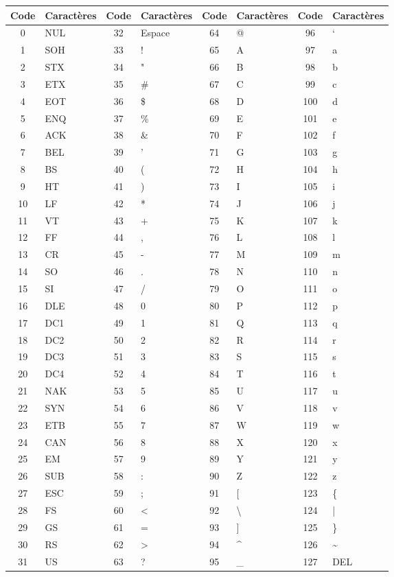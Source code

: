 \documentclass[12pt]{article}
\begin{document}
	\begin{tabular}{|c|l||c|l||c|l||c|l|}
		\hline
		Code & Caractères & Code & Caractères & Code & Caractères & Code & Caractères \\
		\hline
		0 & NUL & 32 & Espace & 64 & @ & 96 & ` \\
		1 & SOH & 33 & ! & 65 & A & 97 & a \\
		2 & STX & 34 & " & 66 & B & 98 & b \\
		3 & ETX & 35 & \# & 67 & C & 99 & c \\
		4 & EOT & 36 & \$ & 68 & D & 100 & d \\
		5 & ENQ & 37 & \% & 69 & E & 101 & e \\
		6 & ACK & 38 & \& & 70 & F & 102 & f \\
		7 & BEL & 39 & ' & 71 & G & 103 & g \\
		8 & BS & 40 & ( & 72 & H & 104 & h \\
		9 & HT & 41 & ) & 73 & I & 105 & i \\
		10 & LF & 42 & * & 74 & J & 106 & j \\
		11 & VT & 43 & + & 75 & K & 107 & k \\
		12 & FF & 44 & , & 76 & L & 108 & l \\
		13 & CR & 45 & - & 77 & M & 109 & m \\
		14 & SO & 46 & . & 78 & N & 110 & n \\
		15 & SI & 47 & / & 79 & O & 111 & o \\
		16 & DLE & 48 & 0 & 80 & P & 112 & p \\
		17 & DC1 & 49 & 1 & 81 & Q & 113 & q \\
		18 & DC2 & 50 & 2 & 82 & R & 114 & r \\
		19 & DC3 & 51 & 3 & 83 & S & 115 & s \\
		20 & DC4 & 52 & 4 & 84 & T & 116 & t \\
		21 & NAK & 53 & 5 & 85 & U & 117 & u \\
		22 & SYN & 54 & 6 & 86 & V & 118 & v \\
		23 & ETB & 55 & 7 & 87 & W & 119 & w \\
		24 & CAN & 56 & 8 & 88 & X & 120 & x \\
		25 & EM & 57 & 9 & 89 & Y & 121 & y \\
		26 & SUB & 58 & : & 90 & Z & 122 & z \\
		27 & ESC & 59 & ; & 91 & [ & 123 & \{ \\
		28 & FS & 60 & < & 92 & \textbackslash & 124 & | \\
		29 & GS & 61 & = & 93 & ] & 125 & \} \\
		30 & RS & 62 & > & 94 & \textasciicircum & 126 & \textasciitilde \\
		31 & US & 63 & ? & 95 & \_ & 127 & DEL \\
		\hline
	\end{tabular}
	
\end{document}
